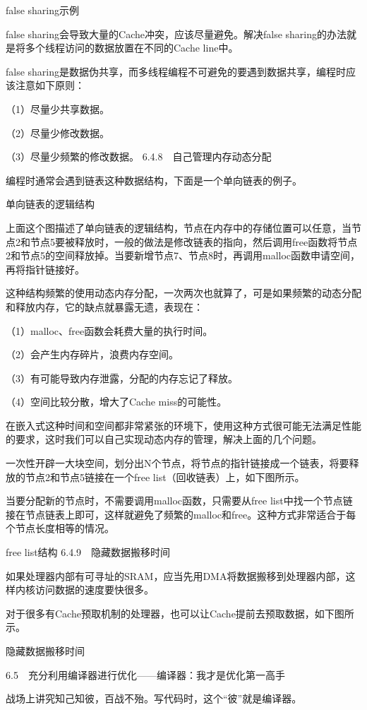 \documentclass[12pt,UTF8]{ctexbook}
\begin{document}
false sharing示例

false sharing会导致大量的Cache冲突，应该尽量避免。解决false sharing的办法就是将多个线程访问的数据放置在不同的Cache line中。

false sharing是数据伪共享，而多线程编程不可避免的要遇到数据共享，编程时应该注意如下原则：

（1）尽量少共享数据。

（2）尽量少修改数据。

（3）尽量少频繁的修改数据。
6.4.8　自己管理内存动态分配

编程时通常会遇到链表这种数据结构，下面是一个单向链表的例子。

单向链表的逻辑结构

上面这个图描述了单向链表的逻辑结构，节点在内存中的存储位置可以任意，当节点2和节点5要被释放时，一般的做法是修改链表的指向，然后调用free函数将节点2和节点5的空间释放掉。当要新增节点7、节点8时，再调用malloc函数申请空间，再将指针链接好。

这种结构频繁的使用动态内存分配，一次两次也就算了，可是如果频繁的动态分配和释放内存，它的缺点就暴露无遗，表现在：

（1）malloc、free函数会耗费大量的执行时间。

（2）会产生内存碎片，浪费内存空间。

（3）有可能导致内存泄露，分配的内存忘记了释放。

（4）空间比较分散，增大了Cache miss的可能性。

在嵌入式这种时间和空间都非常紧张的环境下，使用这种方式很可能无法满足性能的要求，这时我们可以自己实现动态内存的管理，解决上面的几个问题。

一次性开辟一大块空间，划分出N个节点，将节点的指针链接成一个链表，将要释放的节点2和节点5链接在一个free list（回收链表）上，如下图所示。

当要分配新的节点时，不需要调用malloc函数，只需要从free list中找一个节点链接在节点链表上即可，这样就避免了频繁的malloc和free。这种方式非常适合于每个节点长度相等的情况。

free list结构
6.4.9　隐藏数据搬移时间

如果处理器内部有可寻址的SRAM，应当先用DMA将数据搬移到处理器内部，这样内核访问数据的速度要快很多。

对于很多有Cache预取机制的处理器，也可以让Cache提前去预取数据，如下图所示。

隐藏数据搬移时间


6.5　充分利用编译器进行优化——编译器：我才是优化第一高手

战场上讲究知己知彼，百战不殆。写代码时，这个“彼”就是编译器。
\end{document}
